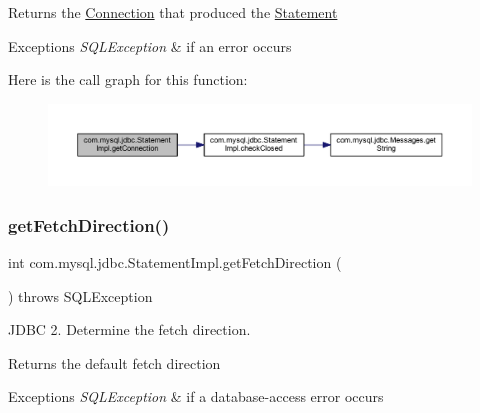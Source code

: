 \begin{DoxyReturn}{Returns}
the \mbox{\hyperlink{interfacecom_1_1mysql_1_1jdbc_1_1_connection}{Connection}} that produced the \mbox{\hyperlink{interfacecom_1_1mysql_1_1jdbc_1_1_statement}{Statement}}
\end{DoxyReturn}

\begin{DoxyExceptions}{Exceptions}
{\em S\+Q\+L\+Exception} & if an error occurs \\
\hline
\end{DoxyExceptions}
Here is the call graph for this function\+:
\nopagebreak
\begin{figure}[H]
\begin{center}
\leavevmode
\includegraphics[width=350pt]{classcom_1_1mysql_1_1jdbc_1_1_statement_impl_ab4532353069891f565129efa3b648433_cgraph}
\end{center}
\end{figure}
\mbox{\label{classcom_1_1mysql_1_1jdbc_1_1_statement_impl_a11e0bed244cd5e9316cb1abb6e801b7a}} 
\subsubsection{\texorpdfstring{get\+Fetch\+Direction()}{getFetchDirection()}}
{\footnotesize\ttfamily int com.\+mysql.\+jdbc.\+Statement\+Impl.\+get\+Fetch\+Direction (\begin{DoxyParamCaption}{ }\end{DoxyParamCaption}) throws S\+Q\+L\+Exception}

J\+D\+BC 2. Determine the fetch direction.

\begin{DoxyReturn}{Returns}
the default fetch direction
\end{DoxyReturn}

\begin{DoxyExceptions}{Exceptions}
{\em S\+Q\+L\+Exception} & if a database-\/access error occurs \\
\hline
\end{DoxyExceptions}
\mbox{\label{classcom_1_1mysql_1_1jdbc_1_1_statement_impl_a1f4c39edc88b50042869f5bc19828059}} 
